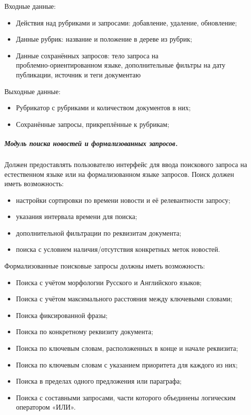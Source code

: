 Входные данные:
\begin{itemize}
\item Действия над рубриками и запросами: добавление, удаление, обновление;
\item Данные рубрик: название и положение в дереве из рубрик;
\item Данные сохранённых запросов: тело запроса на \\ проблемно-ориентированном языке, дополнительные фильтры на дату публикации, источник и теги документаю
\end{itemize}

Выходные данные:
\begin{itemize}
\item Рубрикатор с рубриками и количеством документов в них;
\item Сохранённые запросы, прикреплённые к рубрикам;
\end{itemize}

\subparagraph{Модуль поиска новостей и формализованных запросов.}  \hfill

Должен предоставлять пользователю интерфейс для ввода поискового запроса на
естественном языке или на формализованном языке запросов. Поиск должен
иметь возможность:
\begin{itemize}
\item настройки сортировки по времени новости и её релевантности запросу;
\item указания интервала времени для поиска;
\item дополнительной фильтрации по реквизитам документа;
\item поиска с условием наличия/отсутствия конкретных меток новостей.
\end{itemize}

Формализованные поисковые запросы должны иметь возможность:
\begin{itemize}
\item Поиска с учётом морфологии Русского и Английского языков;
\item Поиска с учётом максимального расстояния между ключевыми словами;
\item Поиска фиксированной фразы;
\item Поиска по конкретному реквизиту документа;
\item Поиска по ключевым словам, расположенных в конце и начале реквизита;
\item Поиска по ключевым словам с указанием приоритета для каждого из них;
\item Поиска в пределах одного предложения или параграфа;
\item Поиска с составными запросами, части которого объединены логическим оператором «ИЛИ».
\end{itemize}

